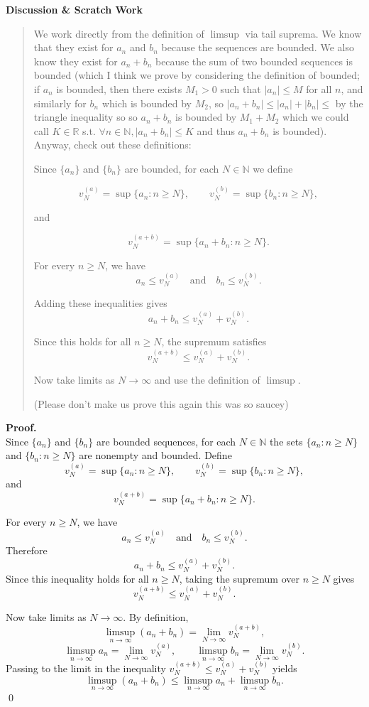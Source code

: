 \documentclass[12pt]{article}
\newenvironment{scratch}{%
  \par\smallskip
  \noindent\textbf{Discussion \& Scratch Work}\begin{quote}\small
}{%
  \end{quote}\smallskip
}
\begin{document}
\begin{scratch}
We work directly from the definition of $\limsup$ via tail suprema. We know that they exist for $a_n$ and $b_n$ because the sequences are bounded. We also know they exist for $a_n+b_n$ because the sum of two bounded sequences is bounded (which I think we prove by considering the definition of bounded; if $a_n$ is bounded, then there exists $M_1>0$ such that $|a_n| \leq M$ for all $n$, and similarly for $b_n$ which is bounded by $M_2$, so $|a_n+b_n| \leq |a_n|+|b_n| \leq $ by the triangle inequality so so $a_n+b_n$ is bounded by $M_1 + M_2$ which we could call $K \in \mathbb{R}$ s.t. $\forall n\in\mathbb{N}, |a_n+b_n| \leq K$ and thus $a_n +b_n$ is bounded). Anyway, check out these definitions:

Since $\{a_n\}$ and $\{b_n\}$ are bounded, for each $N\in\mathbb{N}$ we define

\[
v_N^{(a)} = \sup\{a_n : n \ge N\},
\qquad
v_N^{(b)} = \sup\{b_n : n \ge N\},
\]

and

\[
v_N^{(a+b)} = \sup\{a_n + b_n : n \ge N\}.
\]

For every $n \ge N$, we have
\[
a_n \le v_N^{(a)}
\quad\text{and}\quad
b_n \le v_N^{(b)}.
\]

Adding these inequalities gives
\[
a_n + b_n \le v_N^{(a)} + v_N^{(b)}.
\]

Since this holds for all $n \ge N$, the supremum satisfies
\[
v_N^{(a+b)} \le v_N^{(a)} + v_N^{(b)}.
\]

Now take limits as $N\to\infty$ and use the definition of $\limsup$.

(Please don't make us prove this again this was so saucey)
\end{scratch}

\textbf{Proof.}\\
Since $\{a_n\}$ and $\{b_n\}$ are bounded sequences, for each $N\in\mathbb{N}$ the sets
$\{a_n:n\ge N\}$ and $\{b_n:n\ge N\}$ are nonempty and bounded.
Define
\[
v_N^{(a)}=\sup\{a_n:n\ge N\}, 
\qquad
v_N^{(b)}=\sup\{b_n:n\ge N\},
\]
and
\[
v_N^{(a+b)}=\sup\{a_n+b_n:n\ge N\}.
\]

For every $n\ge N$, we have
\[
a_n \le v_N^{(a)}
\quad\text{and}\quad
b_n \le v_N^{(b)}.
\]
Therefore
\[
a_n + b_n \le v_N^{(a)} + v_N^{(b)}.
\]
Since this inequality holds for all $n\ge N$, taking the supremum over $n\ge N$
gives
\[
v_N^{(a+b)} \le v_N^{(a)} + v_N^{(b)}.
\]

Now take limits as $N\to\infty$. By definition,
\[
\limsup_{n\to\infty}(a_n+b_n)
=
\lim_{N\to\infty} v_N^{(a+b)},
\]
\[
\limsup_{n\to\infty} a_n
=
\lim_{N\to\infty} v_N^{(a)},
\qquad
\limsup_{n\to\infty} b_n
=
\lim_{N\to\infty} v_N^{(b)}.
\]
Passing to the limit in the inequality
$v_N^{(a+b)} \le v_N^{(a)} + v_N^{(b)}$
yields
\[
\limsup_{n\to\infty}(a_n+b_n)
\le
\limsup_{n\to\infty} a_n
+
\limsup_{n\to\infty} b_n.
\]
\qed
\end{document}

